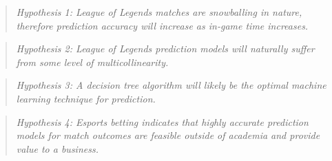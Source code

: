 \begin{quote}  \emph{Hypothesis 1: League of Legends matches are snowballing in nature, therefore prediction accuracy will increase as in-game time increases.} \end{quote}

\begin{quote}  \emph{Hypothesis 2: League of Legends prediction models will naturally suffer from some level of multicollinearity.} \end{quote}

\begin{quote}  \emph{Hypothesis 3: A decision tree algorithm will likely be the optimal machine learning technique for prediction.} \end{quote}

\begin{quote}  \emph{Hypothesis 4: Esports betting indicates that highly accurate prediction models for match outcomes are feasible outside of academia and provide value to a business.} \end{quote}